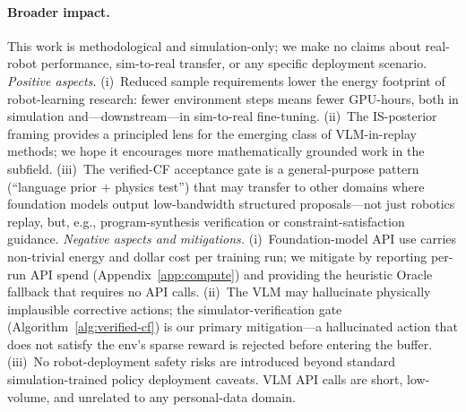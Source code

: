 \documentclass{article}
\begin{document}
\paragraph{Broader impact.}
This work is methodological and simulation-only; we make no claims about
real-robot performance, sim-to-real transfer, or any specific deployment
scenario.
%
\emph{Positive aspects.}
(i)~Reduced sample requirements lower the energy footprint of robot-learning
research: fewer environment steps means fewer GPU-hours, both in simulation
and---downstream---in sim-to-real fine-tuning.
(ii)~The IS-posterior framing provides a principled lens for the
emerging class of VLM-in-replay methods; we hope it encourages more
mathematically grounded work in the subfield.
(iii)~The verified-CF acceptance gate is a general-purpose pattern
(``language prior $+$ physics test'') that may transfer to other domains
where foundation models output low-bandwidth structured proposals---not
just robotics replay, but, e.g., program-synthesis verification or
constraint-satisfaction guidance.
%
\emph{Negative aspects and mitigations.}
(i)~Foundation-model API use carries non-trivial energy and dollar cost per
training run; we mitigate by reporting per-run API spend
(Appendix~\ref{app:compute}) and providing the heuristic Oracle fallback
that requires no API calls.
(ii)~The VLM may hallucinate physically implausible corrective actions; the
simulator-verification gate (Algorithm~\ref{alg:verified-cf}) is our
primary mitigation---a hallucinated action that does not satisfy the env's
sparse reward is rejected before entering the buffer.
(iii)~No robot-deployment safety risks are introduced beyond standard
simulation-trained policy deployment caveats. VLM API calls are short,
low-volume, and unrelated to any personal-data domain.
\end{document}
